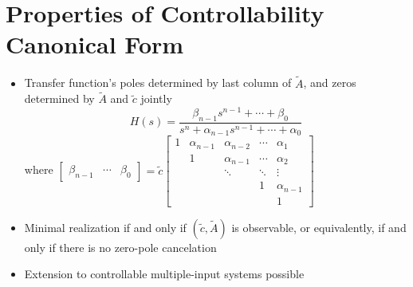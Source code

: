 \documentclass[10pt,a4paper,oneside]{article}
\begin{document}
\section{Properties of Controllability Canonical Form}
\begin{itemize}
\item Transfer function's poles determined by last column of $\tilde{A}$, and zeros determined by $\tilde{A}$ and $\tilde{c}$ jointly
\[
H(s)=\frac{\beta_{n-1} s^{n-1}+\cdots+\beta_{0}}{s^{n}+\alpha_{n-1} s^{n-1}+\cdots+\alpha_{0}}
\]
where $\left[\begin{array}{lll}{\beta_{n-1}} & {\cdots} & {\beta_{0}}\end{array}\right]=\tilde{c}\left[\begin{array}{ccccc}{1} & {\alpha_{n-1}} & {\alpha_{n-2}} & {\cdots} & {\alpha_{1}} \\ {} & {1} & {\alpha_{n-1}} & {\cdots} & {\alpha_{2}} \\{}&{} {} & {\ddots} & {\ddots} & {\vdots} \\ {}&{} & {} & {1} & {\alpha_{n-1}} \\ {}&{} & {} & {} & {1}\end{array}\right]$
\item Minimal realization if and only if $(\tilde{c},\tilde{A})$ is observable, or equivalently, if and only if there is no zero-pole cancelation
\item Extension to controllable multiple-input systems possible
\end{itemize}
\end{document}
